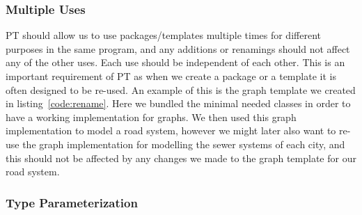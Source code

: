 \subsubsection{Multiple Uses}\label{subsubsec:multiple-uses}
%
PT should allow us to use packages/templates multiple times for different purposes in the same program, and any additions or renamings should not affect any of the other uses.
Each use should be independent of each other.
This is an important requirement of PT as when we create a package or a template it is often designed to be re-used.
An example of this is the graph template we created in listing~\vref{code:rename}.
Here we bundled the minimal needed classes in order to have a working implementation for graphs.
We then used this graph implementation to model a road system, however we might later also want to re-use the graph implementation for modelling the sewer systems of each city, and this should not be affected by any changes we made to the graph template for our road system.

\subsubsection{Type Parameterization}\label{subsubsec:type-parameterization}

%


